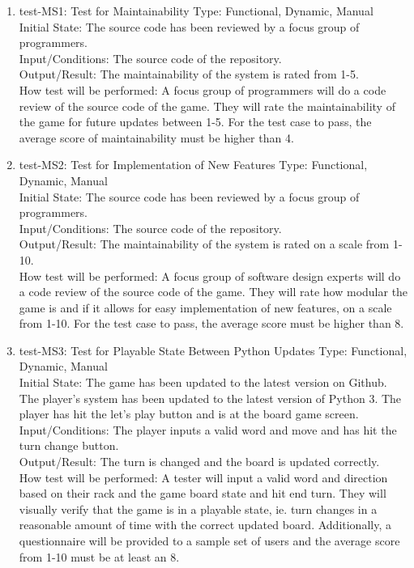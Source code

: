 \documentclass[12pt, titlepage]{article}
\begin{document}
\begin{enumerate}
    \item{test-MS1: Test for Maintainability} %
    Type: Functional, Dynamic, Manual\\
    Initial State: The source code has been reviewed by a focus group of programmers.\\
    Input/Conditions: The source code of the repository.\\
    Output/Result:  The maintainability of the system is rated from 1-5.\\
    How test will be performed: A focus group of programmers will do a code review of the source code of the game. They will rate the maintainability of the game for future updates between 1-5. For the test case to pass, the average score of maintainability must be higher than 4.\\
    
    \item{test-MS2: Test for Implementation of New Features} %
    Type: Functional, Dynamic, Manual\\
    Initial State: The source code has been reviewed by a focus group of programmers.\\
    Input/Conditions: The source code of the repository.\\
    Output/Result:  The maintainability of the system is rated on a scale from 1-10.\\
    How test will be performed: A focus group of software design experts will do a code review of the source code of the game. They will rate how modular the game is and if it allows for easy implementation of new features, on a scale from 1-10. For the test case to pass, the average score must be higher than 8.\\
    
    \item{test-MS3: Test for Playable State Between Python Updates} %
    Type: Functional, Dynamic, Manual\\
    Initial State: The game has been updated to the latest version on Github. The player's system has been updated to the latest version of Python 3. The player has hit the let's play button and is at the board game screen.\\
    Input/Conditions: The player inputs a valid word and move and has hit the turn change button.\\
    Output/Result:  The turn is changed and the board is updated correctly.\\
    How test will be performed: A tester will input a valid word and direction based on their rack and the game board state and hit end turn. They will visually verify that the game is in a playable state, ie. turn changes in a reasonable amount of time with the correct updated board. Additionally, a questionnaire will be provided to a sample set of users and the average score from 1-10 must be at least an 8.\\
\end{enumerate}
\end{document}
